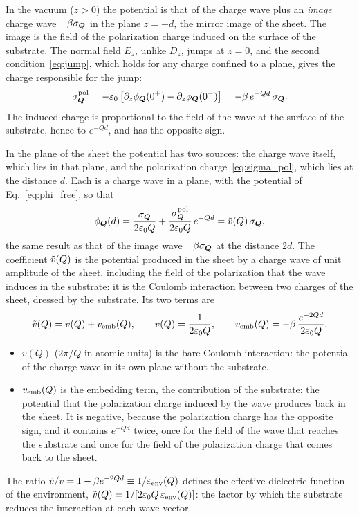 \documentclass[10pt,a4paper]{paper}
\begin{document}
In the vacuum ($z > 0$) the potential is that of the charge wave plus an \emph{image} charge wave
$-\beta\sigma_{\bm{Q}}$ in the plane $z = -d$, the mirror image of the sheet. The image is the field of the polarization
charge induced on the surface of the substrate. The normal field $E_z$, unlike $D_z$, jumps at $z = 0$, and the second
condition~\eqref{eq:jump}, which holds for any charge confined to a plane, gives the charge responsible for the jump:
\begin{equation}
\sigma^{\mathrm{pol}}_{\bm{Q}} = -\varepsilon_0\left[\partial_z\phi_{\bm{Q}}(0^+) - \partial_z\phi_{\bm{Q}}(0^-)\right]
= -\beta\,e^{-Qd}\,\sigma_{\bm{Q}} .
\label{eq:sigma_pol}
\end{equation}
The induced charge is proportional to the field of the wave at the surface of the substrate, hence to $e^{-Qd}$, and
has the opposite sign.

In the plane of the sheet the potential has two sources: the charge wave itself, which lies in that plane, and the
polarization charge~\eqref{eq:sigma_pol}, which lies at the distance $d$. Each is a charge wave in a plane, with the
potential of Eq.~\eqref{eq:phi_free}, so that
\begin{equation}
\phi_{\bm{Q}}(d) = \frac{\sigma_{\bm{Q}}}{2\varepsilon_0 Q} + \frac{\sigma^{\mathrm{pol}}_{\bm{Q}}}{2\varepsilon_0 Q}\,e^{-Qd}
= \tilde{v}(Q)\,\sigma_{\bm{Q}} ,
\label{eq:phi_sheet}
\end{equation}
the same result as that of the image wave $-\beta\sigma_{\bm{Q}}$ at the distance $2d$. The coefficient $\tilde{v}(Q)$ is the
potential produced in the sheet by a charge wave of unit amplitude of the sheet, including the field of the
polarization that the wave induces in the substrate: it is the Coulomb interaction between two charges of the sheet,
dressed by the substrate. Its two terms are
\begin{equation}
\tilde{v}(Q) = v(Q) + v_{\mathrm{emb}}(Q) , \qquad
v(Q) = \frac{1}{2\varepsilon_0 Q} , \qquad
v_{\mathrm{emb}}(Q) = -\beta\,\frac{e^{-2Qd}}{2\varepsilon_0 Q} .
\label{eq:vt_sheet}
\end{equation}
\begin{itemize}
\item $v(Q)$ ($2\pi/Q$ in atomic units) is the bare Coulomb interaction: the potential of the charge wave in its own
  plane without the substrate.
\item $v_{\mathrm{emb}}(Q)$ is the embedding term, the contribution of the substrate: the potential that the polarization
  charge induced by the wave produces back in the sheet. It is negative, because the polarization charge has the
  opposite sign, and it contains $e^{-Qd}$ twice, once for the field of the wave that reaches the substrate and once
  for the field of the polarization charge that comes back to the sheet.
\end{itemize}
The ratio $\tilde{v}/v = 1 - \beta e^{-2Qd} \equiv 1/\varepsilon_{\mathrm{env}}(Q)$ defines the effective dielectric function of the
environment, $\tilde{v}(Q) = 1/[2\varepsilon_0 Q\,\varepsilon_{\mathrm{env}}(Q)]$: the factor by which the substrate reduces the interaction
at each wave vector.
\end{document}
